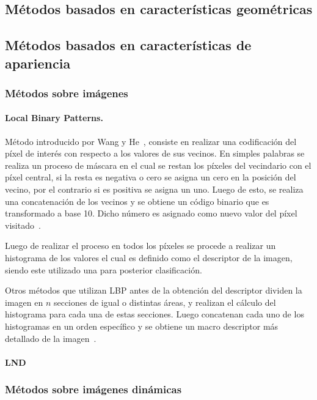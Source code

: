 \subsection{Métodos basados en características geométricas}
\label{sec:met_geo}

\subsection{Métodos basados en características de apariencia}
\label{sec:met_apa}

	\subsubsection{Métodos sobre imágenes}
	\label{sec:met_imagen}
	

		\paragraph{Local Binary Patterns.}
		\label{sec:lbp}
		Método introducido por Wang y He~\cite{Wang1990}, consiste en realizar una codificación del píxel de interés con respecto a los valores de sus vecinos. En simples palabras se realiza un proceso de máscara en el cual se restan los píxeles del vecindario con el píxel central, si la resta es negativa o cero se asigna un cero en la posición del vecino, por el contrario si es positiva se asigna un uno. Luego de esto, se realiza una concatenación de los vecinos y se obtiene un código binario que es transformado a base 10. Dicho número es asignado como nuevo valor del píxel visitado~\cite{Ojala1994,Ojala2002,Ahonen2004,Shan2009}.

Luego de realizar el proceso en todos los píxeles se procede a realizar un histograma de los valores el cual es definido como el descriptor de la imagen, siendo este utilizado una para posterior clasificación.

Otros métodos que utilizan LBP antes de la obtención del descriptor dividen la imagen en $n$ secciones de igual o distintas áreas, y realizan el cálculo del histograma para cada una de estas secciones. Luego concatenan cada uno de los histogramas en un orden específico y se obtiene un macro descriptor más detallado de la imagen~\cite{Ahonen2006}.

		\paragraph{LND}
		\label{sec:lnd}

	\subsubsection{Métodos sobre imágenes dinámicas}	
	\label{sec:met_videos}

